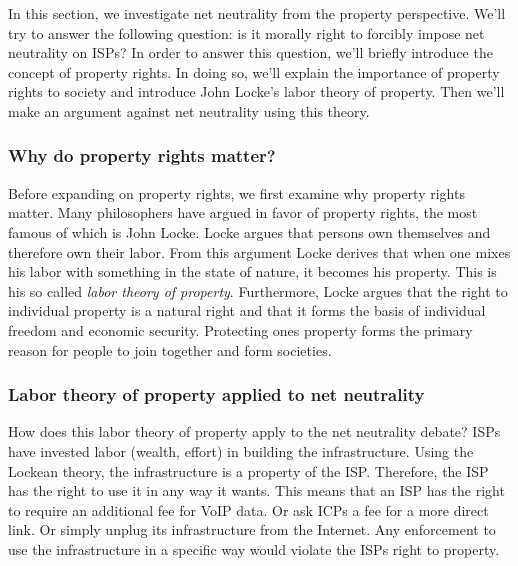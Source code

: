 
In this section, we investigate net neutrality from the property perspective. We'll try to answer the following question: is it morally right to forcibly impose net neutrality on \acp{ISP}? In order to answer this question, we'll briefly introduce the concept of property rights. In doing so, we'll explain the importance of property rights to society and introduce John Locke's labor theory of property. Then we'll make an argument against net neutrality using this theory.

\subsubsection{Why do property rights matter?}
Before expanding on property rights, we first examine why property rights matter. Many philosophers have argued in favor of property rights, the most famous of which is John Locke. Locke argues that persons own themselves and therefore own their labor. From this argument Locke derives that when one mixes his labor with something in the state of nature, it becomes his property. This is his so called \emph{labor theory of property}. Furthermore, Locke argues that the right to individual property is a natural right and that it forms the basis of individual freedom and economic security. Protecting ones property forms the primary reason for people to join together and form societies.

\subsubsection{Labor theory of property applied to net neutrality}
How does this labor theory of property apply to the net neutrality debate? \acp{ISP} have invested labor (wealth, effort) in building the infrastructure. Using the Lockean theory, the infrastructure is a property of the \ac{ISP}. Therefore, the \ac{ISP} has the right to use it in any way it wants. This means that an \ac{ISP} has the right to require an additional fee for \ac{VoIP} data. Or ask ICPs a fee for a more direct link. Or simply unplug its infrastructure from the Internet. Any enforcement to use the infrastructure in a specific way would violate the \acp{ISP} right to property.

